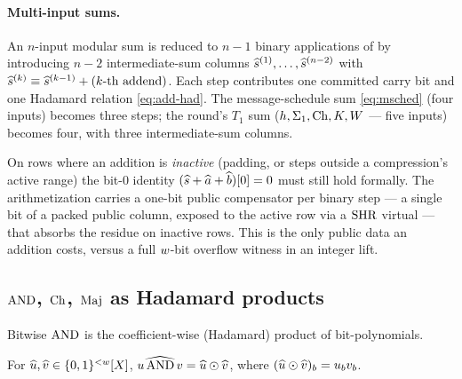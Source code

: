 \paragraph{Multi-input sums.} An $n$-input modular sum is reduced to
$n-1$ binary applications of  by introducing $n-2$
intermediate-sum columns
$\widehat{s}^{(1)},\dots,\widehat{s}^{(n-2)}$ with
$\widehat{s}^{(k)} \equiv \widehat{s}^{(k-1)} + (\text{$k$-th addend})$. Each step
contributes one committed carry bit and one Hadamard relation
\eqref{eq:add-had}. The message-schedule sum \eqref{eq:msched} (four
inputs) becomes three steps; the round's $T_1$ sum
($h,\Sigma_1,\operatorname{Ch},K,W$ --- five inputs) becomes four, with three
intermediate-sum columns.

\begin{remark}
\label{rem:lsb-comp}
On rows where an addition is \emph{inactive} (padding, or steps outside a
compression's active range) the bit-$0$ identity $(\widehat{s}+\widehat{a}+\widehat{b})[0]=0$
must still hold formally. The arithmetization carries a one-bit public
compensator per binary step --- a single bit of a packed public column,
exposed to the active row via a $\operatorname{SHR}$ virtual --- that absorbs the
residue on inactive rows. This is the only public data an addition costs,
versus a full $w$-bit overflow witness in an integer lift.
\end{remark}

\subsection{$\operatorname{AND}$, $\operatorname{Ch}$, $\operatorname{Maj}$ as Hadamard products}
\label{sec:and}

Bitwise $\operatorname{AND}$ is the coefficient-wise (Hadamard) product of
bit-polynomials.

\begin{lemma}
\label{lem:and}
For $\widehat{u},\widehat{v}\in\{0,1\}^{<w}[X]$, $\widehat{u\operatorname{AND} v} = \widehat{u}\odot\widehat{v}$,
where $(\widehat{u}\odot\widehat{v})_b = u_b v_b$.
\end{lemma}


